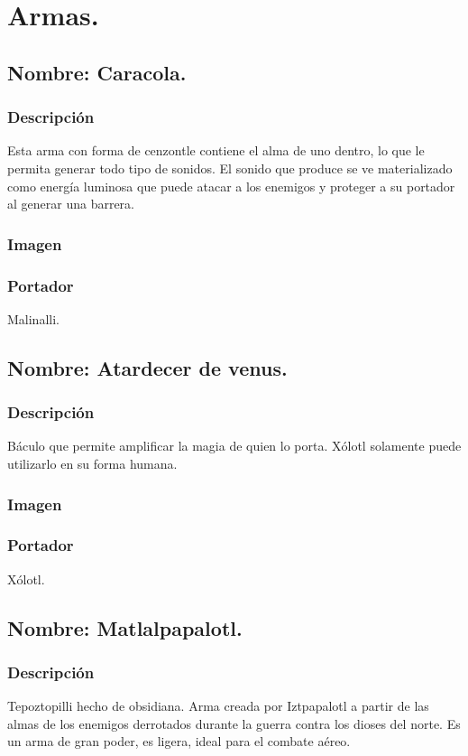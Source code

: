 \chapter{Armas.}
\section{Nombre: Caracola.} \label{Arma:Caracola}
\subsection{Descripción}
Esta arma con forma de cenzontle contiene el alma de uno dentro, lo que le permita generar todo tipo de sonidos. El sonido que produce se ve materializado como energía luminosa que puede atacar a los enemigos y proteger a su portador al generar una barrera.
\subsection{Imagen}
\subsection{Portador}
Malinalli.

\section{Nombre: Atardecer de venus.}\label{Arma:BaculoXolotl}
\subsection{Descripción}
Báculo que permite amplificar la magia de quien lo porta. Xólotl solamente puede utilizarlo en su forma humana.
\subsection{Imagen}
\subsection{Portador}
Xólotl.

\section{Nombre: Matlalpapalotl.}\label{Arma:LanzaItzpapalotl}
\subsection{Descripción}
Tepoztopilli hecho de obsidiana. Arma creada por Iztpapalotl a partir de las almas de los enemigos derrotados durante la guerra contra los dioses del norte. Es un arma de gran poder, es ligera, ideal para el combate aéreo.
